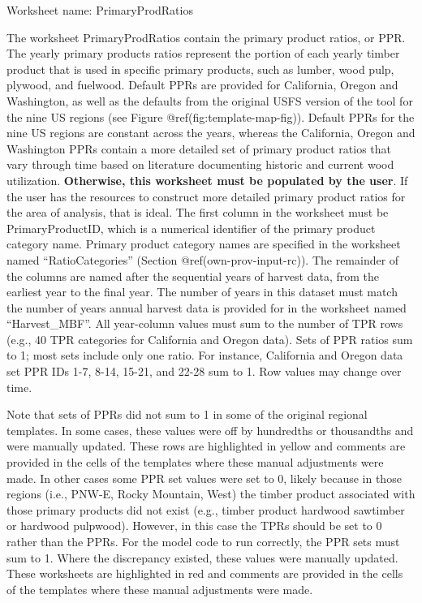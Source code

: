 \documentclass[
  openany]{book}
\begin{document}
Worksheet name: PrimaryProdRatios

The worksheet PrimaryProdRatios contain the primary product ratios, or
PPR. The yearly primary products ratios represent the portion of each
yearly timber product that is used in specific primary products, such as
lumber, wood pulp, plywood, and fuelwood. Default PPRs are provided for
California, Oregon and Washington, as well as the defaults from the
original USFS version of the tool for the nine US regions (see Figure
@ref(fig:template-map-fig)). Default PPRs for the nine US regions are
constant across the years, whereas the California, Oregon and Washington
PPRs contain a more detailed set of primary product ratios that vary
through time based on literature documenting historic and current wood
utilization. \textbf{Otherwise, this worksheet must be populated by the
user}. If the user has the resources to construct more detailed primary
product ratios for the area of analysis, that is ideal. The first column
in the worksheet must be PrimaryProductID, which is a numerical
identifier of the primary product category name. Primary product
category names are specified in the worksheet named ``RatioCategories''
(Section @ref(own-prov-input-rc)). The remainder of the columns are
named after the sequential years of harvest data, from the earliest year
to the final year. The number of years in this dataset must match the
number of years annual harvest data is provided for in the worksheet
named ``Harvest\_MBF''. All year-column values must sum to the number of
TPR rows (e.g., 40 TPR categories for California and Oregon data). Sets
of PPR ratios sum to 1; most sets include only one ratio. For instance,
California and Oregon data set PPR IDs 1-7, 8-14, 15-21, and 22-28 sum
to 1. Row values may change over time.

Note that sets of PPRs did not sum to 1 in some of the original regional
templates. In some cases, these values were off by hundredths or
thousandths and were manually updated. These rows are highlighted in
yellow and comments are provided in the cells of the templates where
these manual adjustments were made. In other cases some PPR set values
were set to 0, likely because in those regions (i.e., PNW-E, Rocky
Mountain, West) the timber product associated with those primary
products did not exist (e.g., timber product hardwood sawtimber or
hardwood pulpwood). However, in this case the TPRs should be set to 0
rather than the PPRs. For the model code to run correctly, the PPR sets
must sum to 1. Where the discrepancy existed, these values were manually
updated. These worksheets are highlighted in red and comments are
provided in the cells of the templates where these manual adjustments
were made.
\end{document}
